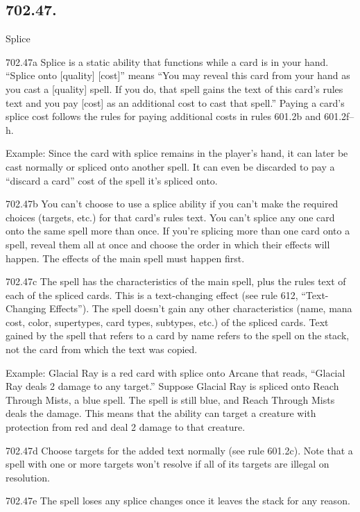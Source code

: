 \subsection*{702.47.}
Splice

702.47a Splice is a static ability that functions while a card is in your hand. “Splice onto [quality] [cost]” means “You may reveal this card from your hand as you cast a [quality] spell. If you do, that spell gains the text of this card’s rules text and you pay [cost] as an additional cost to cast that spell.” Paying a card’s splice cost follows the rules for paying additional costs in rules 601.2b and 601.2f–h.

Example: Since the card with splice remains in the player’s hand, it can later be cast normally or spliced onto another spell. It can even be discarded to pay a “discard a card” cost of the spell it’s spliced onto.

702.47b You can’t choose to use a splice ability if you can’t make the required choices (targets, etc.) for that card’s rules text. You can’t splice any one card onto the same spell more than once. If you’re splicing more than one card onto a spell, reveal them all at once and choose the order in which their effects will happen. The effects of the main spell must happen first.

702.47c The spell has the characteristics of the main spell, plus the rules text of each of the spliced cards. This is a text-changing effect (see rule 612, “Text-Changing Effects”). The spell doesn’t gain any other characteristics (name, mana cost, color, supertypes, card types, subtypes, etc.) of the spliced cards. Text gained by the spell that refers to a card by name refers to the spell on the stack, not the card from which the text was copied.

Example: Glacial Ray is a red card with splice onto Arcane that reads, “Glacial Ray deals 2 damage to any target.” Suppose Glacial Ray is spliced onto Reach Through Mists, a blue spell. The spell is still blue, and Reach Through Mists deals the damage. This means that the ability can target a creature with protection from red and deal 2 damage to that creature.

702.47d Choose targets for the added text normally (see rule 601.2c). Note that a spell with one or more targets won’t resolve if all of its targets are illegal on resolution.

702.47e The spell loses any splice changes once it leaves the stack for any reason.

